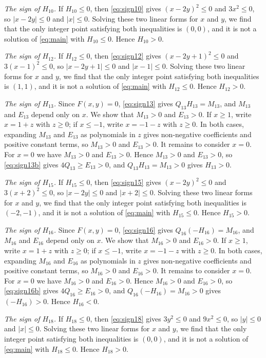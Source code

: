 \documentclass[11pt]{article}
\begin{document}
\emph{The sign of $H_{10}$.} If $H_{10}\leq0$, then \eqref{eq:sign10} gives $(x-2y)^2\leq 0$ and $3x^2\leq 0$, so $|x-2y|\leq0$ and $|x|\leq0$. Solving these two linear forms for $x$ and $y$, we find that the only integer point satisfying both inequalities is $(0,0)$, and it is not a solution of \eqref{eq:main} with $H_{10}\leq0$. Hence $H_{10}>0$.

\emph{The sign of $H_{12}$.} If $H_{12}\leq0$, then \eqref{eq:sign12} gives $(x-2y+1)^2\leq 0$ and $3(x-1)^2\leq 0$, so $|x-2y+1|\leq0$ and $|x-1|\leq0$. Solving these two linear forms for $x$ and $y$, we find that the only integer point satisfying both inequalities is $(1,1)$, and it is not a solution of \eqref{eq:main} with $H_{12}\leq0$. Hence $H_{12}>0$.

\emph{The sign of $H_{13}$.} Since $F(x,y)=0$, \eqref{eq:sign13} gives $Q_{13}H_{13}=M_{13}$, and $M_{13}$ and $E_{13}$ depend only on $x$. We show that $M_{13}>0$ and $E_{13}>0$. If $x\geq1$, write $x=1+z$ with $z\geq0$; if $x\leq-1$, write $x=-1-z$ with $z\geq0$. In both cases, expanding $M_{13}$ and $E_{13}$ as polynomials in $z$ gives non-negative coefficients and positive constant terms, so $M_{13}>0$ and $E_{13}>0$. It remains to consider $x=0$. For $x=0$ we have $M_{13}>0$ and $E_{13}>0$. Hence $M_{13}>0$ and $E_{13}>0$, so \eqref{eq:sign13b} gives $4Q_{13}\geq E_{13}>0$, and $Q_{13}H_{13}=M_{13}>0$ gives $H_{13}>0$.

\emph{The sign of $H_{15}$.} If $H_{15}\leq0$, then \eqref{eq:sign15} gives $(x-2y)^2\leq 0$ and $3(x+2)^2\leq 0$, so $|x-2y|\leq0$ and $|x+2|\leq0$. Solving these two linear forms for $x$ and $y$, we find that the only integer point satisfying both inequalities is $(-2,-1)$, and it is not a solution of \eqref{eq:main} with $H_{15}\leq0$. Hence $H_{15}>0$.

\emph{The sign of $H_{16}$.} Since $F(x,y)=0$, \eqref{eq:sign16} gives $Q_{16}(-H_{16})=M_{16}$, and $M_{16}$ and $E_{16}$ depend only on $x$. We show that $M_{16}>0$ and $E_{16}>0$. If $x\geq1$, write $x=1+z$ with $z\geq0$; if $x\leq-1$, write $x=-1-z$ with $z\geq0$. In both cases, expanding $M_{16}$ and $E_{16}$ as polynomials in $z$ gives non-negative coefficients and positive constant terms, so $M_{16}>0$ and $E_{16}>0$. It remains to consider $x=0$. For $x=0$ we have $M_{16}>0$ and $E_{16}>0$. Hence $M_{16}>0$ and $E_{16}>0$, so \eqref{eq:sign16b} gives $4Q_{16}\geq E_{16}>0$, and $Q_{16}(-H_{16})=M_{16}>0$ gives $(-H_{16})>0$. Hence $H_{16}<0$.

\emph{The sign of $H_{18}$.} If $H_{18}\leq0$, then \eqref{eq:sign18} gives $3y^2\leq 0$ and $9x^2\leq 0$, so $|y|\leq0$ and $|x|\leq0$. Solving these two linear forms for $x$ and $y$, we find that the only integer point satisfying both inequalities is $(0,0)$, and it is not a solution of \eqref{eq:main} with $H_{18}\leq0$. Hence $H_{18}>0$.
\end{document}
